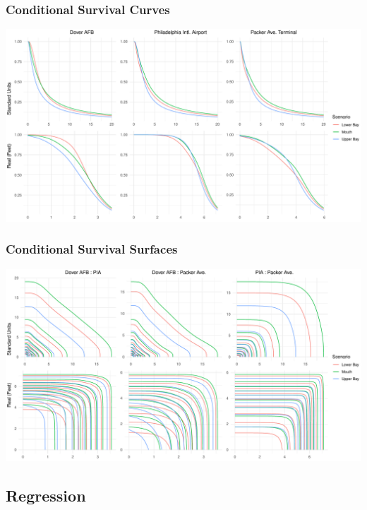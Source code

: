 \documentclass[aspectratio=169,10pt]{beamer}
\newlength{\frametextheight}
\begin{document}
\begin{frame}
    \frametitle{Conditional Survival Curves}
    \begin{center}
        \includegraphics[height=0.99\frametextheight]{./ch3/plots/condsurv/condsurv_1d_mcmc_combined}
    \end{center}
\end{frame} %

\begin{frame}
    \frametitle{Conditional Survival Surfaces}
    \begin{center}
        \includegraphics[height=0.99\frametextheight]{./ch3/plots/condsurv/condsurv_2d_mcmc_combined}
    \end{center}
\end{frame} %

\subsection{Regression}
\end{document}
